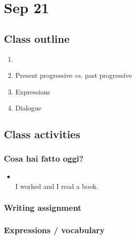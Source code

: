 \part{Sep 21} \label{M1-sep21}
\chapter{Class outline} \label{M1-classoutline}

\begin{enumerate}
    \item {}
    \item Present progressive \textit{vs.} past progressive
    \item Expressions
    \item Dialogue
\end{enumerate}

\chapter{Class activities}

\section{Cosa hai fatto oggi?}
\begin{itemize}[nosep]
    \item {} \\
          I worked and I read a book.
\end{itemize}

\section{Writing assignment}

\section{Expressions / vocabulary}

